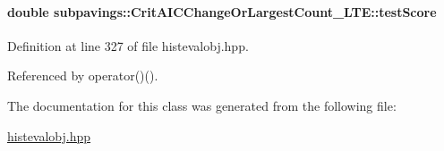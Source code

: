 \hypertarget{classsubpavings_1_1CritAICChangeOrLargestCount__LTE_abe3e0f28dc25e6bbdaba43c05a28083d}{
\paragraph[{test\-Score}]{\setlength{\rightskip}{0pt plus 5cm}double {\bf subpavings\-::\-Crit\-A\-I\-C\-Change\-Or\-Largest\-Count\-\_\-\-L\-T\-E\-::test\-Score}}}\label{classsubpavings_1_1CritAICChangeOrLargestCount__LTE_abe3e0f28dc25e6bbdaba43c05a28083d}


\-Definition at line 327 of file histevalobj.\-hpp.



\-Referenced by operator()().



\-The documentation for this class was generated from the following file\-:\begin{DoxyCompactItemize}
\item 
\hyperlink{histevalobj_8hpp}{histevalobj.\-hpp}\end{DoxyCompactItemize}
